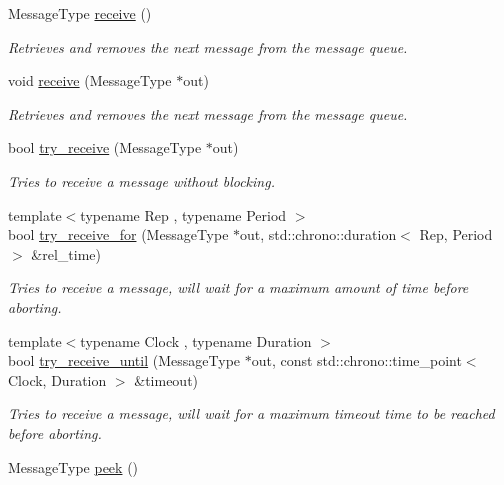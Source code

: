 \begin{DoxyCompactItemize}
Message\+Type \hyperlink{classcpen333_1_1process_1_1message__queue_a39d2e54480fba6a441e70cb1362d3900}{receive} ()
\begin{DoxyCompactList}\small\item\em Retrieves and removes the next message from the message queue. \end{DoxyCompactList}\item 
void \hyperlink{classcpen333_1_1process_1_1message__queue_a63eccb93a61129e6e6dec2db5f5b1f2b}{receive} (Message\+Type $\ast$out)
\begin{DoxyCompactList}\small\item\em Retrieves and removes the next message from the message queue. \end{DoxyCompactList}\item 
bool \hyperlink{classcpen333_1_1process_1_1message__queue_ae42a9bd9edc9753a38fa63f20a34cc60}{try\+\_\+receive} (Message\+Type $\ast$out)
\begin{DoxyCompactList}\small\item\em Tries to receive a message without blocking. \end{DoxyCompactList}\item 
{\footnotesize template$<$typename Rep , typename Period $>$ }\\bool \hyperlink{classcpen333_1_1process_1_1message__queue_a4264047863208a01109569f62d093885}{try\+\_\+receive\+\_\+for} (Message\+Type $\ast$out, std\+::chrono\+::duration$<$ Rep, Period $>$ \&rel\+\_\+time)
\begin{DoxyCompactList}\small\item\em Tries to receive a message, will wait for a maximum amount of time before aborting. \end{DoxyCompactList}\item 
{\footnotesize template$<$typename Clock , typename Duration $>$ }\\bool \hyperlink{classcpen333_1_1process_1_1message__queue_abf193426822dfbb27fc1ce972db42da0}{try\+\_\+receive\+\_\+until} (Message\+Type $\ast$out, const std\+::chrono\+::time\+\_\+point$<$ Clock, Duration $>$ \&timeout)
\begin{DoxyCompactList}\small\item\em Tries to receive a message, will wait for a maximum timeout time to be reached before aborting. \end{DoxyCompactList}\item 
Message\+Type \hyperlink{classcpen333_1_1process_1_1message__queue_a22e2c27bc1fe660b573129f7518ecec7}{peek} ()

\end{DoxyCompactItemize}
